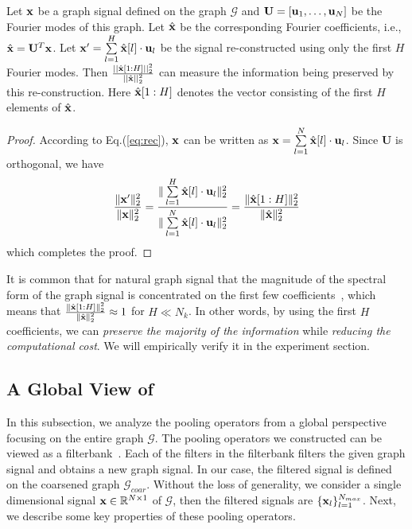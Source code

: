 \documentclass[sigconf]{acmart}
\newcommand{\pooling}{{\sf {EigenPooling}}}
\begin{document}
\begin{theorem}
Let ${\bf x}$ be a graph signal defined on the graph $\mathcal{G}$ and $\mathbf{U} = [{\bf u}_1, \dots, {\bf u}_{N}]$ be the Fourier modes of this graph. Let $\hat{\bf x}$ be the corresponding Fourier coefficients, i.e., $\hat{\bf x} = \mathbf{U}^T \mathbf{x}$. Let ${\bf x}' = \sum\limits_{l=1}^{H}\hat{\bf x}[l]\cdot {\bf u}_l$ be the signal re-constructed using only the first $H$ Fourier modes. Then $\frac{||\hat{\bf x}[1:H]||^2_2}{||\hat{\bf x}||^2_2}$ can measure the information being preserved by this re-construction. Here $\hat{\bf x}[1:H]$ denotes the vector consisting of the first $H$ elements of $\hat{\bf x}$.

\end{theorem}
\begin{proof}
According to Eq.(\ref{eq:rec}), ${\bf x}$ can be written as ${\bf x} = \sum\limits_{l=1}^{N} \hat{{\bf x}}[l] \cdot {\bf u}_l$. Since $\mathbf{U}$ is orthogonal, we have
\begin{align}
    \frac{\|{\bf x}'\|_2^2}{\|{\bf x}\|_2^2} = \frac{\| \sum\limits_{l=1}^{H} \hat{\bf x}[l]\cdot {\bf u}_l\|^2_2}{\|\sum\limits_{l=1}^{N} \hat{{\bf x}}[l] \cdot {\bf u}_l\|_2^2} = \frac{\|\hat{\bf x}[1:H]\|^2_2}{\|\hat{\bf x}\|^2_2}
\end{align}
which completes the proof.
\end{proof}

It is common that for natural graph signal that the magnitude of the spectral form of the graph signal is concentrated on the first few coefficients~\cite{sandryhaila2013discrete,shuman2013emerging}, which means that $\frac{\|\hat{\bf x}[1:H]\|^2_2}{\|\hat{\bf x}\|^2_2} \approx 1$ for $H\ll N_k$. In other words, by using the first $H$ coefficients, we can \textit{preserve the majority of the information} while \textit{reducing the computational cost}. We will empirically verify it in the experiment section.

\subsection{A Global View of \pooling} \label{sec:global}
In this subsection, we analyze the pooling operators from a global perspective focusing on the entire graph $\mathcal{G}$. The pooling operators we constructed can be viewed as a filterbank~\cite{tremblay2016subgraph}. Each of the filters in the filterbank filters the given graph signal and obtains a new graph signal. In our case, the filtered signal is defined on the coarsened graph $\mathcal{G}_{coar}$. Without the loss of generality, we consider a single dimensional signal ${\bf x}\in \mathbb{R}^{N\times 1}$ of $\mathcal{G}$, then the filtered signals are $\{{\bf x}_l\}_{l=1}^{N_{max}}$. Next, we describe some key properties of these pooling operators. 
\end{document}
